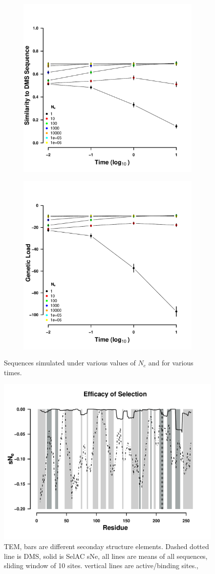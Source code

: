 \documentclass[12pt]{article}
\begin{document}
\begin{figure}[h]
    \centering
    \begin{subfigure}
        \centering
        \includegraphics[width=.45\textwidth]{img/simulated_dist_time.pdf}
    \end{subfigure}
    \begin{subfigure}
        \centering
        \includegraphics[width=.45\textwidth]{img/simulated_gl_time.pdf}
    \end{subfigure}
    \caption{Sequences simulated under various values of $N_e$ and for various times.}
    \label{fig:dms_sim}
\end{figure}



\begin{figure}[H]
     \centering
	\includegraphics[width=\textwidth]{img/sNe_slide_TEM2016}
	\caption{TEM, bars are different seconday structure elements. Dashed dotted line is DMS, solid is SelAC sNe, all lines are means of all sequences, sliding window of 10 sites. vertical lines are active/binding sites.,}
	\label{fig:tem2016_sse}
\end{figure}
\end{document}
